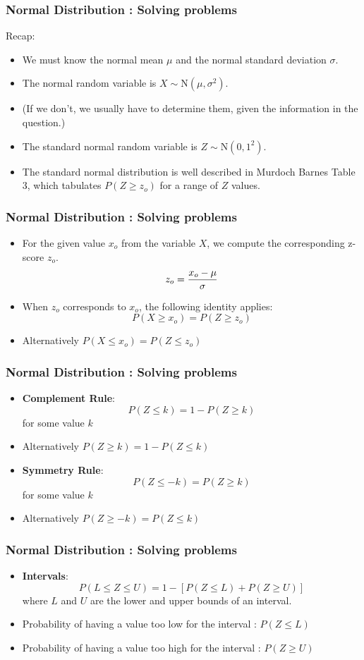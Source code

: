 \documentclass[a4]{beamer}
\begin{document}
\begin{frame}
\frametitle{Normal Distribution : Solving problems}
Recap:
\begin{itemize}
\item We must know the normal mean $\mu$ and the normal standard deviation $\sigma$.
\item The normal random variable is $X \sim \mbox{N} ( \mu , \sigma^2)$.\smallskip
\item (If we don't, we usually have to determine them, given the information in the question.)\smallskip
\item The standard normal random variable is $Z\sim \mbox{N} ( 0 , 1^2)$.\smallskip
\item The standard normal distribution is well described in Murdoch Barnes Table 3, which tabulates $P(Z \geq z_o)$ for a range of $Z$ values.
\end{itemize}
\end{frame}
\begin{frame}
\frametitle{Normal Distribution : Solving problems}
\begin{itemize}
\item For the given value $x_o$ from the variable $X$, we compute the corresponding z-score $z_o$.
\[ z_o = { x_o - \mu \over \sigma} \]
\item When $z_o$ corresponds to $x_o$, the following identity applies:
\[  P(X \geq x_o )= P(Z \geq z_o ) \]
\item Alternatively $ P(X \leq x_o )= P(Z \leq z_o ) $
\end{itemize}
\end{frame}
\begin{frame}
\frametitle{Normal Distribution : Solving problems}
\begin{itemize}
\item \textbf{Complement Rule}: \[ P(Z \leq k) = 1-P(Z \geq k) \] for some value $k$
\item Alternatively $ P(Z \geq k) = 1-P(Z \leq k) $
\item \textbf{Symmetry Rule}: \[ P(Z \leq -k) = P(Z \geq k) \] for some value $k$
\item Alternatively $ P(Z \geq -k) = P(Z \leq k) $
\end{itemize}
\end{frame}
\begin{frame}
\frametitle{Normal Distribution : Solving problems}
\begin{itemize}

\item \textbf{Intervals}: \[ P(L \leq Z \leq U) = 1- [ P(Z \leq L) + P(Z \geq U)] \]
where $L$ and $U$ are the lower and upper bounds of an interval.
\item Probability of having a value too low for the interval : $P(Z \leq L)$
\item Probability of having a value too high for the interval : $P(Z \geq U)$
\end{itemize}
\end{frame}
\end{document}
